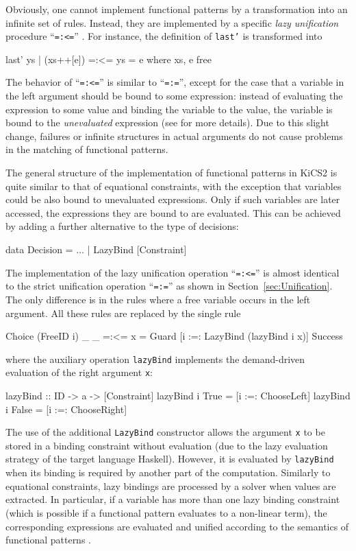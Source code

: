 \documentclass{llncs}
\newcommand{\code}[1]{\mbox{\small\texttt{#1}}}
\newcommand{\ccode}[1]{``\code{#1}''}
\begin{document}
Obviously, one cannot implement functional patterns by
a transformation into an infinite set of rules. Instead, they are
implemented by a specific \emph{lazy unification} procedure \ccode{=:<=}
\cite{AntoyHanus05LOPSTR}.
For instance, the definition of \code{last'} is transformed into
\begin{curry}
  last' ys | (xs++[e]) =:<= ys  = e   where xs, e free
\end{curry}
The behavior of \ccode{=:<=} is similar to \ccode{=:=},
except for the case that a variable in the left argument
should be bound to some expression: instead of evaluating
the expression to some value and binding the variable to the value,
the variable is bound to the \emph{unevaluated} expression
(see \cite{AntoyHanus05LOPSTR} for more details).
Due to this slight change, failures or infinite structures
in actual arguments do not cause problems in the matching
of functional patterns.

The general structure of the implementation of functional patterns in KiCS2
is quite similar to that of equational constraints,
with the exception that variables could be also bound
to unevaluated expressions. 
Only if such variables are later
accessed, the expressions they are bound to are evaluated.
This can be achieved by adding a further alternative
to the type of decisions:
\begin{haskell}
  data Decision = $\ldots$ | LazyBind [Constraint]
\end{haskell}
%
The implementation of the lazy unification operation \ccode{=:<=}
is almost identical to the strict unification operation \ccode{=:=}
as shown in Section~\ref{sec:Unification}.
The only difference is in the rules where a free variable occurs
in the left argument. All these rules are replaced by the single
rule
\begin{haskell}
  Choice (FreeID i) _ _ =:<= x
    = Guard [i :=: LazyBind (lazyBind i x)] Success
\end{haskell}
where the auxiliary operation \code{lazyBind}
implements the demand-driven evaluation of the right argument \code{x}:
\begin{haskell}
  lazyBind :: ID -> a -> [Constraint]
  lazyBind i True  = [i :=: ChooseLeft]
  lazyBind i False = [i :=: ChooseRight]
\end{haskell}
The use of the additional \code{LazyBind} constructor allows the argument 
\code{x} to be stored in a binding constraint without evaluation 
(due to the lazy evaluation strategy of the
target language Haskell).
However, it is evaluated by \code{lazyBind} when its binding
is required by another part of the computation.
Similarly to equational constraints,
lazy bindings are processed by a solver when values are extracted.
In particular, if a variable has more than one lazy binding constraint
(which is possible if a functional pattern evaluates to a non-linear term),
the corresponding expressions are evaluated and unified
according to the semantics of functional patterns
\cite{AntoyHanus05LOPSTR}.
\end{document}
